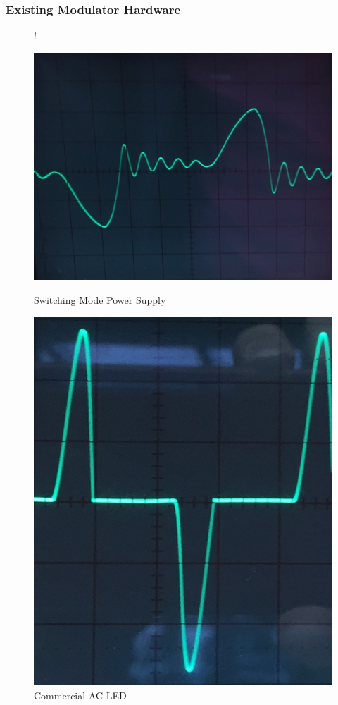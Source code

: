 \documentclass{beamer}
\begin{document}
	\begin{frame}\frametitle{Existing Modulator Hardware}

		\begin{figure}
			 {!} {
			  \centering
			  \begin{minipage}[b]{0.48\textwidth}
			    \includegraphics[width=\textwidth]{../chapters/hardware-chapters/smps-current-primary-with-load-cropped.jpg}
			    \caption{Switching Mode Power Supply}
			  \end{minipage}
			  \hfill
			  \begin{minipage}[b]{0.4\textwidth}
			    \includegraphics[width=\textwidth]{../chapters/hardware-chapters/commercial-230v-ac-led-on-cropped.png}
			    \caption{Commercial AC LED}
			  \end{minipage}
		  }
		\end{figure}


\end{frame}
\end{document}
